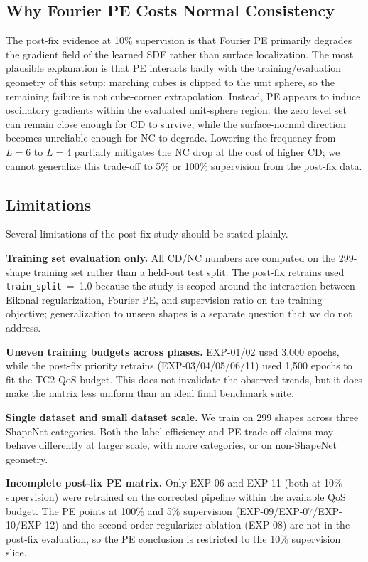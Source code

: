 \documentclass[conference]{IEEEtran}
\begin{document}
\subsection{Why Fourier PE Costs Normal Consistency}
\label{sec:why_pe}

The post-fix evidence at 10\% supervision is that Fourier PE primarily degrades the gradient field of the learned SDF rather than surface localization. The most plausible explanation is that PE interacts badly with the training/evaluation geometry of this setup: marching cubes is clipped to the unit sphere, so the remaining failure is not cube-corner extrapolation. Instead, PE appears to induce oscillatory gradients within the evaluated unit-sphere region: the zero level set can remain close enough for CD to survive, while the surface-normal direction becomes unreliable enough for NC to degrade. Lowering the frequency from $L=6$ to $L=4$ partially mitigates the NC drop at the cost of higher CD; we cannot generalize this trade-off to 5\% or 100\% supervision from the post-fix data.

\subsection{Limitations}
\label{sec:limitations}

Several limitations of the post-fix study should be stated plainly.

\textbf{Training set evaluation only.} All CD/NC numbers are computed on the 299-shape training set rather than a held-out test split. The post-fix retrains used \texttt{train\_split}~=~1.0 because the study is scoped around the interaction between Eikonal regularization, Fourier PE, and supervision ratio on the training objective; generalization to unseen shapes is a separate question that we do not address.

\textbf{Uneven training budgets across phases.} EXP-01/02 used 3{,}000 epochs,
while the post-fix priority retrains (EXP-03/04/05/06/11) used 1{,}500 epochs
to fit the TC2 QoS budget. This does not invalidate the observed trends, but it
does make the matrix less uniform than an ideal final benchmark suite.

\textbf{Single dataset and small dataset scale.} We train on 299 shapes across three ShapeNet categories. Both the label-efficiency and PE-trade-off claims may behave differently at larger scale, with more categories, or on non-ShapeNet geometry.

\textbf{Incomplete post-fix PE matrix.} Only EXP-06 and EXP-11 (both at 10\% supervision) were retrained on the corrected pipeline within the available QoS budget. The PE points at 100\% and 5\% supervision (EXP-09/EXP-07/EXP-10/EXP-12) and the second-order regularizer ablation (EXP-08) are not in the post-fix evaluation, so the PE conclusion is restricted to the 10\% supervision slice.
\end{document}
